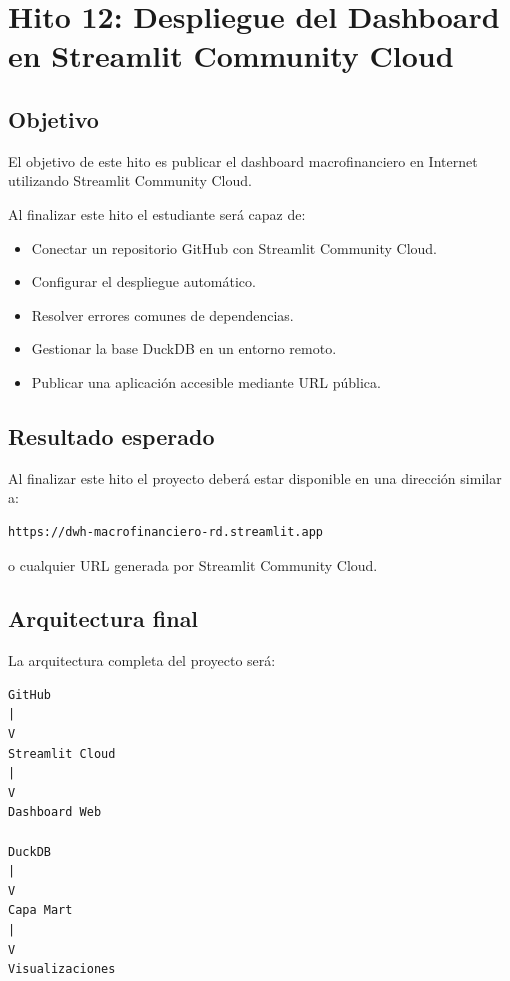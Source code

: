 \chapter{Hito 12: Despliegue del Dashboard en Streamlit Community Cloud}

\section{Objetivo}

El objetivo de este hito es publicar el dashboard macrofinanciero en Internet utilizando Streamlit Community Cloud.

Al finalizar este hito el estudiante será capaz de:

\begin{itemize}
\item Conectar un repositorio GitHub con Streamlit Community Cloud.
\item Configurar el despliegue automático.
\item Resolver errores comunes de dependencias.
\item Gestionar la base DuckDB en un entorno remoto.
\item Publicar una aplicación accesible mediante URL pública.
\end{itemize}

\section{Resultado esperado}

Al finalizar este hito el proyecto deberá estar disponible en una dirección similar a:

\begin{verbatim}
https://dwh-macrofinanciero-rd.streamlit.app
\end{verbatim}

o cualquier URL generada por Streamlit Community Cloud.

\section{Arquitectura final}

La arquitectura completa del proyecto será:

\begin{verbatim}
GitHub
|
V
Streamlit Cloud
|
V
Dashboard Web

DuckDB
|
V
Capa Mart
|
V
Visualizaciones
\end{verbatim}

